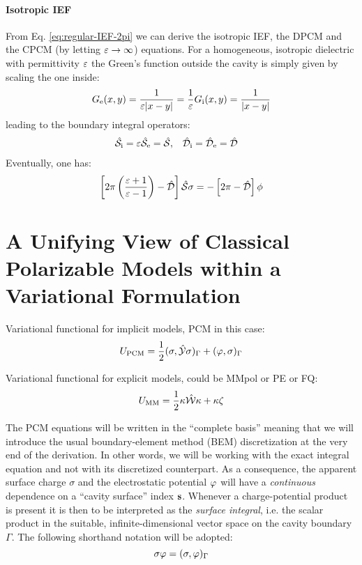 \paragraph{Isotropic IEF}
From Eq. \eqref{eq:regular-IEF-2pi} we can derive the isotropic IEF,
the DPCM and the CPCM (by letting $\varepsilon\rightarrow\infty$) equations.
For a homogeneous, isotropic dielectric with permittivity $\varepsilon$ the
Green's function outside the cavity is simply given by scaling the one
inside:
\begin{equation}
  G_\mathrm{e}(x, y) = \frac{1}{\varepsilon|x-y|} = \frac{1}{\varepsilon} G_\mathrm{i}(x, y) = \frac{1}{|x-y|}
\end{equation}
leading to the boundary integral operators:
\begin{alignat}{2}
  \hat{\mathcal{S}}_\mathrm{i} = \varepsilon\hat{\mathcal{S}}_\mathrm{e} = \hat{\mathcal{S}}, \quad&
  \hat{\mathcal{D}}_\mathrm{i} = \hat{\mathcal{D}}_\mathrm{e} = \hat{\mathcal{D}}
\end{alignat}
Eventually, one has:
\begin{equation}
  \left[ 2\pi \left(\frac{\varepsilon+1}{\varepsilon-1}\right)
  - \hat{\mathcal{D}} \right]\hat{\mathcal{S}}\sigma
  =
  -\left[2\pi-\hat{\mathcal{D}}\right]\phi
\end{equation}

\section[Variational Formulation of Classical Polarizable Models]{
A Unifying View of Classical Polarizable Models within a Variational Formulation}
\label{sec:variational}

Variational functional for implicit models, \acs{PCM} in this case:
\begin{equation}
 U_\mathrm{PCM} = \frac{1}{2}(\sigma, \hat{\mathcal{Y}}\sigma)_{\Gamma} + (\varphi, \sigma)_{\Gamma}
\end{equation}

Variational functional for explicit models, could be MMpol or PE or FQ:
\begin{equation}
  U_\mathrm{MM} = \frac{1}{2}\kappa\hat{\mathcal{W}}\kappa + \kappa\zeta
\end{equation}

The PCM equations will be written in the ``complete basis'' meaning that
we will introduce the usual boundary-element method (BEM) discretization
at the very end of the derivation. In other words, we will be working
with the exact integral equation and not with its discretized
counterpart. As a consequence, the apparent surface charge $\sigma$ and
the electrostatic potential $\varphi$ will have a \emph{continuous}
dependence on a ``cavity surface'' index $\mathbf{s}$. Whenever a
charge-potential product is present it is then to be interpreted as the
\emph{surface integral}, i.e. the scalar product in the suitable,
infinite-dimensional vector space on the cavity boundary $\Gamma$. The
following shorthand notation will be adopted:
\begin{equation}
 \sigma\varphi = (\sigma, \varphi)_{\Gamma}
\end{equation}

